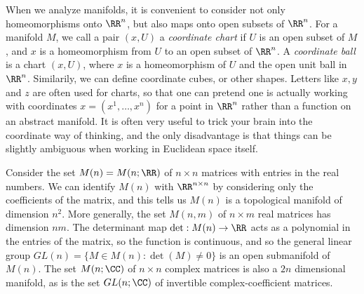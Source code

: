 When we analyze manifolds, it is convenient to consider not only homeomorphisms onto $\RR^n$, but also maps onto open subsets of $\RR^n$. For a manifold $M$, we call a pair $(x,U)$ a \emph{coordinate chart} if $U$ is an open subset of $M$, and $x$ is a homeomorphism from $U$ to an open subset of $\RR^n$. A \emph{coordinate ball} is a chart $(x,U)$, where $x$ is a homeomorphism of $U$ and the open unit ball in $\RR^n$. Similarily, we can define coordinate cubes, or other shapes. Letters like $x,y$ and $z$ are often used for charts, so that one can pretend one is actually working with coordinates $x = (x^1,\dots,x^n)$ for a point in $\RR^n$ rather than a function on an abstract manifold. It is often very useful to trick your brain into the coordinate way of thinking, and the only disadvantage is that things can be slightly ambiguous when working in Euclidean space itself.

\begin{example}
    Consider the set $M(n) = M(n;\RR)$ of $n \times n$ matrices with entries in the real numbers. We can identify $M(n)$ with $\RR^{n \times n}$ by considering only the coefficients of the matrix, and this tells us $M(n)$ is a topological manifold of dimension $n^2$. More generally, the set $M(n,m)$ of $n \times m$ real matrices has dimension $nm$. The determinant map $\det: M(n) \to \RR$ acts as a polynomial in the entries of the matrix, so the function is continuous, and so the general linear group $GL(n) = \{ M \in M(n) : \det(M) \neq 0 \}$ is an open submanifold of $M(n)$. The set $M(n;\CC)$ of $n \times n$ complex matrices is also a $2n$ dimensional manifold, as is the set $GL(n;\CC)$ of invertible complex-coefficient matrices.
\end{example}

